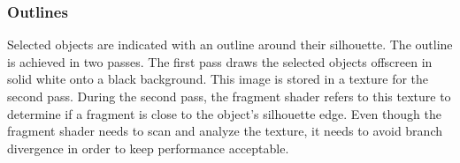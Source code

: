 \documentclass[10pt]{article}
\begin{document}
\subsubsection{Outlines}
Selected objects are indicated with an outline around their silhouette. The outline is achieved in two passes. The first pass draws the selected objects offscreen in solid white onto a black background. This image is stored in a texture for the second pass. During the second pass, the fragment shader refers to this texture to determine if a fragment is close to the object's silhouette edge. Even though the fragment shader needs to scan and analyze the texture, it needs to avoid branch divergence in order to keep performance acceptable.
\end{document}
